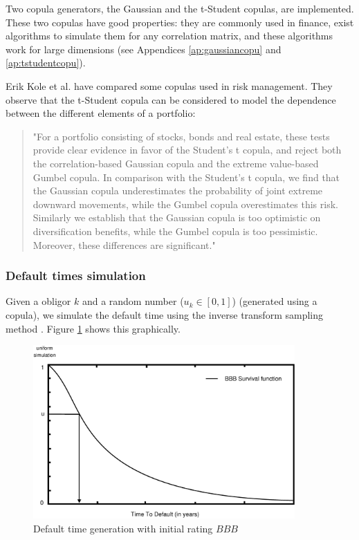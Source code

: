 \documentclass[a4paper,12pt,final]{article}
\begin{document}
Two copula generators, the Gaussian and the t-Student copulas, are implemented. 
These two copulas have good properties: they are commonly used in finance, exist 
algorithms to simulate them for any correlation matrix, and these algorithms work 
for large dimensions (see Appendices \ref{ap:gaussiancopu} and \ref{ap:tstudentcopu}).
\newline

Erik Kole et al. \cite{copu:selecting} have compared some copulas used in risk 
management. They observe that the t-Student copula can be considered to model the 
dependence between the different elements of a portfolio:
\begin{quotation}
"For a portfolio consisting of stocks, bonds and real estate, these tests provide
clear evidence in favor of the Student's t copula, and reject both the correlation-based
Gaussian copula and the extreme value-based Gumbel copula. In comparison with the
Student's t copula, we find that the Gaussian copula underestimates the probability of
joint extreme downward movements, while the Gumbel copula overestimates this risk.
Similarly we establish that the Gaussian copula is too optimistic on diversiﬁcation
benefits, while the Gumbel copula is too pessimistic. Moreover, these differences are
significant."
\end{quotation}

\subsubsection{Default times simulation}
\label{sec:deftimessim}
Given a obligor $k$ and a random number ($u_k \in [0,1]$) (generated using a 
copula), we simulate the default time using the inverse transform sampling
method \cite{ref:cred_risk}. Figure \ref{simttd} shows this graphically.

\begin{figure}[!hbt]
\begin{center}
\includegraphics[width=10cm,angle=0]{./images/simttd.eps}
\caption{Default time generation with initial rating $BBB$}
\label{simttd}
\end{center}
\end{figure}
\FloatBarrier
\end{document}
